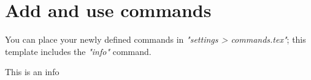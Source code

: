 \section{Add and use commands}
You can place your newly defined commands in \textit{"settings > commands.tex"}; this template includes the \textit{"info"} command.

\begin{info}
    This is an info
\end{info}